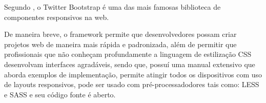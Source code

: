 Segundo \cite{jumpStartResponsiveWebDesign}, o \acs{Twitter Bootstrap}  é uma
das mais famosas biblioteca de componentes responsivos na web.

De maneira breve, o framework permite que desenvolvedores possam criar
projetos web de maneira mais rápida e padronizada, além de permitir que
profissionais que não conheçam profundamente a linguagem de estilização 
\acs{CSS} desenvolvam interfaces agradáveis, sendo que, possuí uma manual 
extensivo que aborda exemplos de implementação, permite atingir todos os 
dispositivos com uso de layouts responsivos, pode ser usado com
pré-processadodores  tais como: \acs{LESS} e \acs{SASS} e seu código fonte é
aberto.
